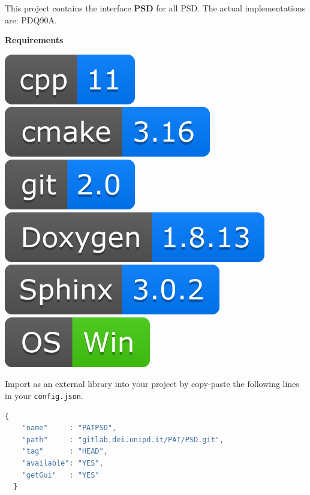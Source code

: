 
This project contains the interface \textbf{PSD} for all PSD. The actual
implementations are: PDQ90A.

\textbf{Requirements}

\includegraphics[scale=0.7]{img/shilds/cpp.png}
\includegraphics[scale=0.7]{img/shilds/cmake.png}
\includegraphics[scale=0.7]{img/shilds/git.png}
\includegraphics[scale=0.7]{img/shilds/doxygen.png}
\includegraphics[scale=0.7]{img/shilds/sphinx.png}
\includegraphics[scale=0.7]{img/shilds/win.png}



Import as an external library into your project by copy-paste the
following lines in your \texttt{config.json}.

\begin{lstlisting}[language=javascript, gobble=2]
  {
    "name"     : "PATPSD",
    "path"     : "gitlab.dei.unipd.it/PAT/PSD.git",
    "tag"      : "HEAD",
    "available": "YES",
    "getGui"   : "YES"
  }
\end{lstlisting}


